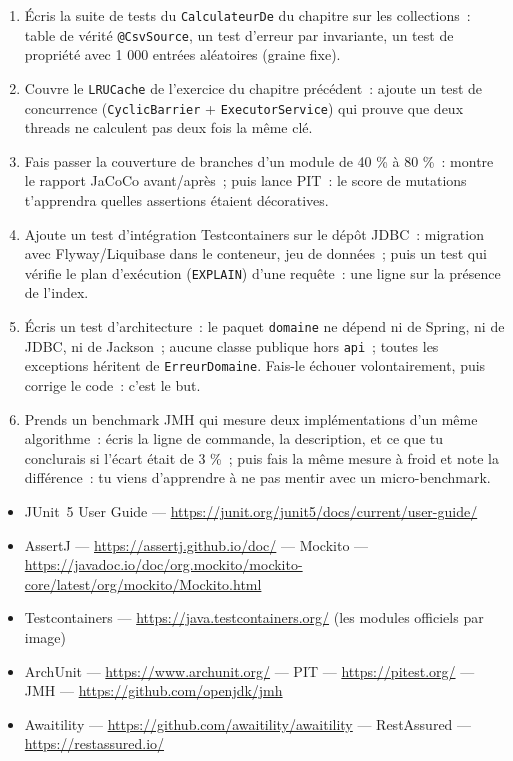 \documentclass[12pt,a4paper,twoside,openright]{book}
\begin{document}
\begin{exercice}
\begin{enumerate}
  \item \'Ecris la suite de tests du \verb|CalculateurDe| du chapitre sur les collections~: table de
        v\'erit\'e \verb|@CsvSource|, un test d'erreur par invariante, un test de propri\'et\'e avec 1 000
        entr\'ees al\'eatoires (graine fixe).
  \item Couvre le \verb|LRUCache| de l'exercice du chapitre pr\'ec\'edent~: ajoute un test de
        concurrence (\verb|CyclicBarrier| + \verb|ExecutorService|) qui prouve que deux threads
        ne calculent pas deux fois la m\^eme cl\'e.
  \item Fais passer la couverture de branches d'un module de 40 \% \`a 80 \%~: montre le rapport
        JaCoCo avant/apr\`es~; puis lance PIT~: le score de mutations t'apprendra quelles assertions
        \'etaient d\'ecoratives.
  \item Ajoute un test d'int\'egration Testcontainers sur le d\'ep\^ot JDBC~: migration avec Flyway/Liquibase
        dans le conteneur, jeu de donn\'ees~; puis un test qui v\'erifie le plan d'ex\'ecution
        (\verb|EXPLAIN|) d'une requ\^ete~: une ligne sur la pr\'esence de l'index.
  \item \'Ecris un test d'architecture~: le paquet \verb|domaine| ne d\'epend ni de Spring, ni de JDBC,
        ni de Jackson~; aucune classe publique hors \verb|api|~; toutes les exceptions h\'eritent de
        \verb|ErreurDomaine|. Fais-le \'echouer volontairement, puis corrige le code~: c'est le but.
  \item Prends un benchmark JMH qui mesure deux impl\'ementations d'un m\^eme algorithme~:
        \'ecris la ligne de commande, la description, et ce que tu conclurais si l'\'ecart \'etait de
        3 \%~; puis fais la m\^eme mesure \`a froid et note la diff\'erence~: tu viens d'apprendre \`a ne
        pas mentir avec un micro-benchmark.
\end{enumerate}
\end{exercice}

\begin{ressources}
\begin{itemize}
  \item JUnit~5 User Guide --- \url{https://junit.org/junit5/docs/current/user-guide/}
  \item AssertJ --- \url{https://assertj.github.io/doc/} --- Mockito --- \url{https://javadoc.io/doc/org.mockito/mockito-core/latest/org/mockito/Mockito.html}
  \item Testcontainers --- \url{https://java.testcontainers.org/} (les modules officiels par image)
  \item ArchUnit --- \url{https://www.archunit.org/} --- PIT --- \url{https://pitest.org/} --- JMH --- \url{https://github.com/openjdk/jmh}
  \item Awaitility --- \url{https://github.com/awaitility/awaitility} --- RestAssured --- \url{https://restassured.io/}
\end{itemize}
\end{ressources}
\end{document}
